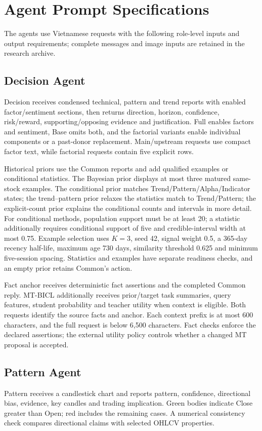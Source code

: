 \FloatBarrier
\appendix
\section{Agent Prompt Specifications}
\label{app:prompts}
The agents use Vietnamese requests with the following role-level inputs and output requirements; complete messages and image inputs are retained in the research archive.

\subsection{Decision Agent}
\label{app:prompt_decision}
Decision receives condensed technical, pattern and trend reports with enabled factor/sentiment sections, then returns direction, horizon, confidence, risk/reward, supporting/opposing evidence and justification. Full enables factors and sentiment, Base omits both, and the factorial variants enable individual components or a past-donor replacement. Main/upstream requests use compact factor text, while factorial requests contain five explicit rows.

Historical priors use the Common reports and add qualified examples or conditional statistics. The Bayesian prior displays at most three matured same-stock examples. The conditional prior matches Trend/Pattern/Alpha/Indicator states; the trend--pattern prior relaxes the statistics match to Trend/Pattern; the explicit-count prior explains the conditional counts and intervals in more detail. For conditional methods, population support must be at least 20; a statistic additionally requires conditional support of five and credible-interval width at most 0.75. Example selection uses $K=3$, seed 42, signal weight 0.5, a 365-day recency half-life, maximum age 730 days, similarity threshold 0.625 and minimum five-session spacing. Statistics and examples have separate readiness checks, and an empty prior retains Common's action.

Fact anchor receives deterministic fact assertions and the completed Common reply. MT-BICL additionally receives prior/target task summaries, query features, student probability and teacher utility when context is eligible. Both requests identify the source facts and anchor. Each context prefix is at most 600 characters, and the full request is below 6,500 characters. Fact checks enforce the declared assertions; the external utility policy controls whether a changed MT proposal is accepted.

\subsection{Pattern Agent}
\label{app:prompt_pattern}
Pattern receives a candlestick chart and reports pattern, confidence, directional bias, evidence, key candles and trading implication. Green bodies indicate Close greater than Open; red includes the remaining cases. A numerical consistency check compares directional claims with selected OHLCV properties.

